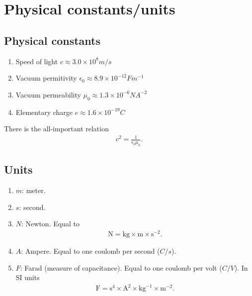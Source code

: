 \documentclass[12pt]{report}
\begin{document}
\chapter{Physical constants/units}

\section{Physical constants}
\begin{enumerate}
    \item Speed of light $c\approx 3.0 \times 10^8 m/s$
    \item Vacuum permitivity $\epsilon_0\approx 8.9 \times 10^{-12} F m^{-1}$
    \item Vacuum permeability $\mu_0\approx 1.3\times 10^{-6} N A^{-2}$
    \item Elementary charge $e\approx 1.6\times 10^{-19}C$
\end{enumerate}

There is the all-important relation
\begin{align}
    c^2
    =
    \frac{1}{\epsilon_0\mu_0}
    .
\end{align}

\section{Units}
\begin{enumerate}
    \item $m$: meter. 
    \item $s$: second. 
    \item $N$: Newton.
        Equal to 
        \begin{align}
            \mathrm{N}
            =
            \mathrm{kg} \times \mathrm{m} \times \mathrm{s}^{-2}
            .
        \end{align}
    \item $A$: Ampere. Equal to one coulomb per second ($C/s$).
    \item $F$: Farad (measure of capacitance). Equal to one coulomb per volt ($C/V$).
        In SI units
        \begin{align}
            \mathrm{F} = \mathrm{s}^4\times \mathrm{A}^2 \times \mathrm{kg}^{-1} \times \mathrm{m}^{-2}
            .
        \end{align}
\end{enumerate}


\end{document}
